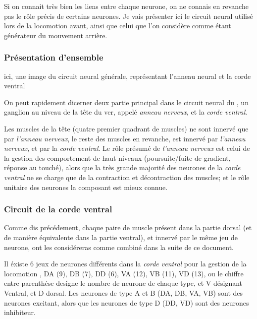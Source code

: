 Si on connait très bien les liens entre chaque neurone, on ne connais en
revanche pas le rôle précis de certains neurones. Je vais présenter ici le
circuit neural utilisé lors de la locomotion avant, ainsi que celui que l'on
considère comme étant générateur du mouvement arrière.

\subsubsection{Présentation d'ensemble} %
\label{ssub:Présentation d'ensemble}

\begin{center}
   ici, une image du circuit neural générale, représentant l'anneau neural et la corde ventral
\end{center}

On peut rapidement dicerner deux partie principal dans le circuit neural du
\celeg{}, un ganglion au niveau de la tête du ver, appelé \textit{anneau
nerveux}, et la \textit{corde ventral}.

Les muscles de la tête (quatre premier quadrant de muscles) ne sont innervé que
par \textit{l'anneau nerveux}, le reste des muscles en revanche, est innervé
par \textit{l'anneau nerveux}, et par la \textit{corde ventral}.  Le rôle
présumé de \textit{l'anneau nerveux} est celui de la gestion des comportement
de haut niveaux (poursuite/fuite de gradient, réponse au touché), alors que la
très grande majorité des neurones de la \textit{corde ventral} ne se charge que
de la contraction et décontraction des muscles; et le rôle unitaire des neurones
la composant est mieux connue.


\subsubsection{Circuit de la corde ventral} %
\label{ssub:Circuit de la corde ventral}

Comme dis précédement, chaque paire de muscle présent dans la partie dorsal
(et de manière équivalente dans la partie ventral), et innervé par le même
jeu de neurone, ont les considéreras comme combiné dans la suite de ce document.

Il éxiste 6 jeux de neurones différents dans la \textit{corde ventral} pour la
gestion de la locomotion \cite{Boyle2009}, DA (9), DB (7), DD (6), VA (12), VB
(11), VD (13), ou le chiffre entre parenthése designe le nombre de neurone de
chaque type, et V désignant Ventral, et D dorsal.  Les neurones de type A et B
(DA, DB, VA, VB) sont des neurones excitant, alors que les neurones de type D
(DD, VD) sont des neurones inhibiteur.\\


